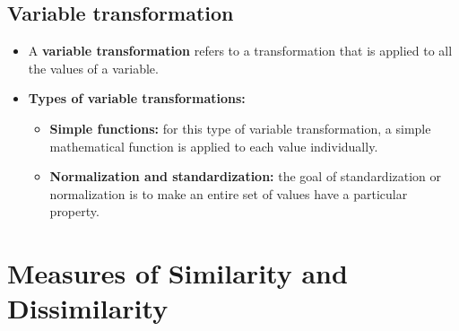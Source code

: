 	\subsection*{Variable transformation}
		\begin{itemize}
			\item A {\bf variable transformation} refers to a transformation that is applied to
			all the values of a variable. 
			\item{\bf Types of variable transformations:}
				\begin{itemize}
					\item{\bf Simple functions:} for this type of variable transformation, a 
					simple mathematical function is applied to each value individually. 
					\item{\bf Normalization and standardization:} the goal of standardization 
					or normalization is to make an entire set of values have a particular 
					property. 
				\end{itemize}
		\end{itemize}

\section{Measures of Similarity and Dissimilarity}




